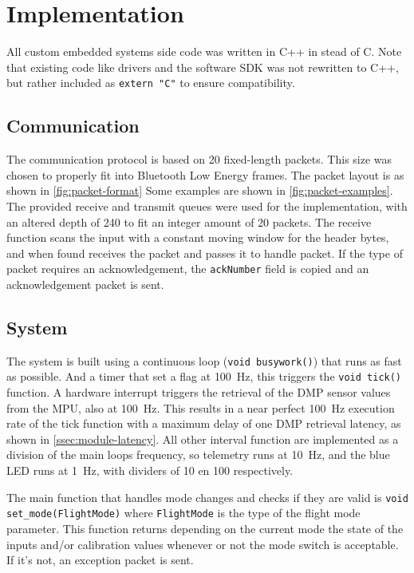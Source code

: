 \documentclass[final]{article}
\begin{document}
\section{Implementation}
\label{sec:implementation}

All custom embedded systems side code was written in C++ in stead of C.
Note that existing code like drivers and the software SDK was not rewritten to C++, but rather included as \texttt{extern "C"} to ensure compatibility.

\subsection{Communication}
The communication protocol is based on \SI{20}{\byte} fixed-length packets.
This size was chosen to properly fit into Bluetooth Low Energy frames.
The packet layout is as shown in \cref{fig:packet-format}
Some examples are shown in \cref{fig:packet-examples}.
The provided receive and transmit queues were used for the implementation, with an altered depth of \SI{240}{\byte} to fit an integer amount of \SI{20}{\byte} packets.
The receive function scans the input with a constant moving window for the header bytes, and when found receives the packet and passes it to handle packet.
If the type of packet requires an acknowledgement, the \texttt{ackNumber} field is copied and an acknowledgement packet is sent.

\subsection{System}
\label{ssec:implementation-system}
The system is built using a continuous loop (\texttt{void busywork()}) that runs as fast as possible.
And a timer that set a flag at \SI{100}{\hertz}, this triggers the \texttt{void tick()} function.
A hardware interrupt triggers the retrieval of the DMP sensor values from the MPU, also at \SI{100}{\hertz}.
This results in a near perfect \SI{100}{\hertz} execution rate of the tick function with a maximum delay of one DMP retrieval latency, as shown in \cref{ssec:module-latency}.
All other interval function are implemented as a division of the main loops frequency, so telemetry runs at \SI{10}{\hertz}, and the blue LED runs at \SI{1}{\hertz}, with dividers of 10 en 100 respectively.

The main function that handles mode changes and checks if they are valid is \texttt{void set\_mode(FlightMode)} where \texttt{FlightMode} is the type of the flight mode parameter.
This function returns depending on the current mode the state of the inputs and/or calibration values whenever or not the mode switch is acceptable.
If it's not, an exception packet is sent.
\end{document}
